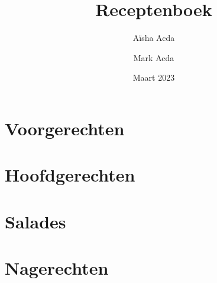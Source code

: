 \documentclass{article}
\title{Receptenboek}
\author{Aïsha Acda \and Mark Acda}
\date{Maart 2023}
\begin{document}
\maketitle

\tableofcontents

\newpage
\section{Voorgerechten}
% 

\newpage
\section{Hoofdgerechten}


\newpage
\section{Salades}
% 

\newpage
\section{Nagerechten}
% 
\end{document}
